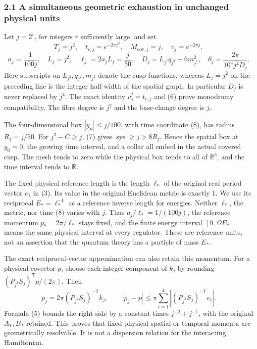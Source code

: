 \documentclass[
  11pt,
]{article}
\begin{document}
\subsubsection{2.1 A simultaneous geometric exhaustion in unchanged
physical
units}\label{a-simultaneous-geometric-exhaustion-in-unchanged-physical-units}

Let \(j=2^r\), for integers \(r\) sufficiently large, and set \[
 T_j=j^2,\quad t_{c,j}=e^{-2\pi j^2},\quad
 M_{\mathrm{cov},j}=j,\quad v_j=e^{-2\pi j},
\] \[
 a_j=\frac1{100j},\quad L_j=j^2,\quad
 \ell_j=2a_jL_j=\frac j{50},\quad
 D_j=L_{j^2}q_{j^2}+6m_{j^2}^2,\quad
 \theta_j=\frac{2\pi}{10^4j^2D_j}.
\tag{12}
\] Here subscripts on \(L_{j^2},q_{j^2},m_{j^2}\) denote the cusp
functions, whereas \(L_j=j^2\) on the preceding line is the integer
half-width of the spatial graph. In particular \(D_j\) is never replaced
by \(j^4\). The exact identity \(v_j^j=t_{c,j}\) and (6) prove monodromy
compatibility. The fibre degree is \(j^2\) and the base-change degree is
\(j\).

The four-dimensional box \(|y_\mu|\le j/100\), with time coordinate (8),
has radius \(R_j=j/50\). For \(j^2-C\ge j\), (7) gives
\(\operatorname{sys}\ge j>8R_j\). Hence the spatial box at \(y_0=0\),
the growing time interval, and a collar all embed in the actual covered
cusp. The mesh tends to zero while the physical box tends to all of
\(\mathbb R^3\), and the time interval tends to \(\mathbb R\).

The fixed physical reference length is the length \(\ell_*\) of the
original real period vector \(e_1\) in (3). Its value in the original
Euclidean metric is exactly 1. We use its reciprocal \(E_*=\ell_*^{-1}\)
as a reference inverse length for energies. Neither \(\ell_*\), the
metric, nor time (8) varies with \(j\). Thus \(a_j/\ell_*=1/(100j)\),
the reference momentum \(p_*=2\pi/\ell_*\) stays fixed, and the finite
energy interval \([0,\Omega E_*]\) means the same physical interval at
every regulator. These are reference units, not an assertion that the
quantum theory has a particle of mass \(E_*\).

The exact reciprocal-vector approximation can also retain this momentum.
For a physical covector \(p\), choose each integer component of \(k_j\)
by rounding \((P_{j^2}S_j)^{\mathsf T}p/(2\pi)\). Then \[
 p_j=2\pi(P_{j^2}S_j)^{-\mathsf T}k_j,\qquad
 |p_j-p|\le\pi\sum_{i=1}^4|(P_{j^2}S_j)^{-\mathsf T}e_i|.
\] Formula (5) bounds the right side by a constant times
\(j^{-2}+j^{-1}\), with the original \(A_T,B_T\) retained. This proves
that fixed physical spatial or temporal momenta are geometrically
resolvable. It is not a dispersion relation for the interacting
Hamiltonian.
\end{document}
